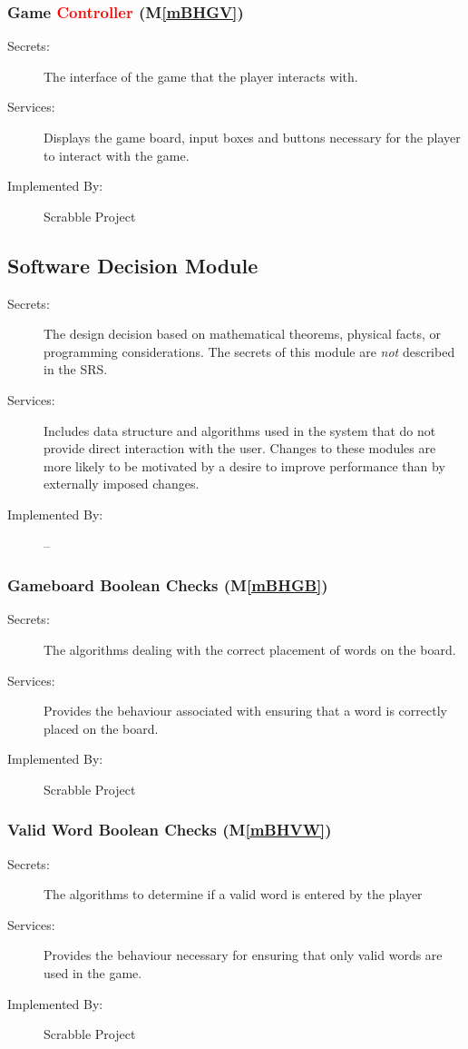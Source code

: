 \documentclass[12pt, titlepage]{article}
\newcommand{\mref}[1]{M\ref{#1}}
\begin{document}
\subsubsection{Game \textcolor{red}{Controller} (\mref{mBHGV})}
\begin{description}
\item[Secrets:]The interface of the game that the player interacts with.
\item[Services:]Displays the game board, input boxes and buttons necessary for the player to interact with the game.
\item[Implemented By:] Scrabble Project
\end{description}

\subsection{Software Decision Module}
\begin{description}
\item[Secrets:] The design decision based on mathematical theorems, physical
  facts, or programming considerations. The secrets of this module are
  \emph{not} described in the SRS.
\item[Services:] Includes data structure and algorithms used in the system that
  do not provide direct interaction with the user. Changes to these modules are more likely to be motivated by a desire to improve performance than by externally imposed changes.
\item[Implemented By:] --
\end{description}

\subsubsection{Gameboard Boolean Checks (\mref{mBHGB})}
\begin{description}
\item[Secrets:]The algorithms dealing with the correct placement of words on the board.
\item[Services:]Provides the behaviour associated with ensuring that a word is correctly placed on the board. 
\item[Implemented By:] Scrabble Project
\end{description}

\subsubsection{Valid Word Boolean Checks (\mref{mBHVW})}
\begin{description}
\item[Secrets:]The algorithms to determine if a valid word is entered by the player
\item[Services:] Provides the behaviour necessary for ensuring that only valid words are used in the game.
\item[Implemented By:] Scrabble Project
\end{description}
\end{document}
